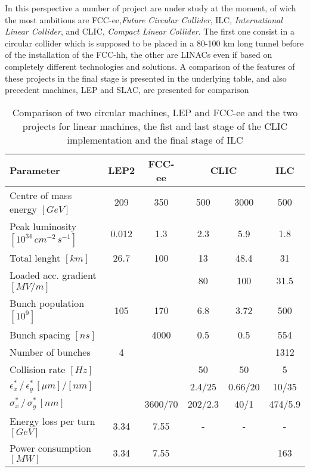 In this perspective a number of project are under study at the moment, of wich the most ambitious are FCC-ee,\textit{Future Circular Collider}, ILC, \textit{International Linear Collider}, and CLIC, \textit{Compact Linear Collider}. The first one consist in a circular collider which is supposed to be placed in a 80-100 km long tunnel before of the installation of the FCC-hh, the other are LINACs even if based on completely different technologies and solutions.  A comparison of the features of these projects in the final stage is presented in the underlying table, and also precedent machines, LEP and SLAC, are presented for comparison

\begin{table}[h]
  \centering
    \begin{tabular}{ l c c | c c c }
    \hline
    \hline
    Parameter								& LEP2	&	FCC-ee	&  \multicolumn{2}{c}{CLIC}	&	ILC	\\
    \hline
    Centre of mass energy $[GeV]$				& 209	& 350  		&  	500	&  3000	& 500	\\
    Peak luminosity $[10^{34} \, cm^{-2} \, s^{-1}]$	&0.012	& 1.3			&  	2.3	& 	5.9	&1.8		\\
    Total lenght $[km]$						&26.7	& 100		& 13		&  48.4	& 31		\\
    Loaded acc. gradient $[MV/m]$				&		& 			& 80		& 100 	& 31.5	\\
    Bunch population $[10^9]$					& 105	& 170  		&  6.8	& 	3.72	& 500	\\
    Bunch spacing $[ns]$						& 		& 4000	  	&  	0.5	& 	0.5	& 554	\\
    Number of bunches						& 4		&  			&  		& 		& 1312	\\
    Collision rate $[Hz]$						&  		&  			&  	50	& 	50	& 5		\\
    $\epsilon^*_x \, / \, \epsilon^*_y \, [\mu m]/[nm]$	& 		&  		        &  2.4/25	& 0.66/20	& 10/35	\\  
    $\sigma^*_x\, / \, \sigma^*_y\, [nm]$			& 		&  	3600/70	&  202/2.3	& 40/1	&474/5.9	\\    
    Energy loss per turn $[GeV]$					&  3.34	& 	7.55		& - 		& -		& -		\\
    Power consumption $[MW]$					&  3.34	& 	7.55		& 		& 		& 163	\\
    \hline
    \hline
    \end{tabular}
  \caption{Comparison of two circular machines, LEP\cite{FCC-ee:leptonCollParam} and FCC-ee\cite{FCC-ee:leptonCollParam,Zimmermann:2057706} and the two projects for linear machines, the fist and last stage of the CLIC implementation \cite{CLIC:cdr} and the final stage of ILC\cite{ILC:tdr} }
\end{table}



